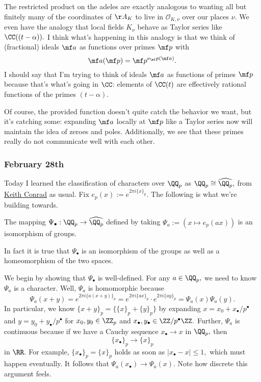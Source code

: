 The restricted product on the adeles are exactly analogous to wanting all but finitely many of the coordinates of $\AA_K$ to live in $\mathcal O_{K,\nu}$ over our places $\nu.$ We even have the analogy that local fields $K_\nu$ behave as Taylor series like $\CC((t-\alpha)).$ I think what's happening in this analogy is that we think of (fractional) ideals $\mf a$ as functions over primes $\mf p$ with
\[\mf a(\mf p)=\mf p^{\nu_\mf p(\mf a)}.\]
I should say that I'm trying to think of ideals $\mf a$ as functions of primes $\mf p$ because that's what's going in $\CC$: elements of $\CC(t)$ are effectively rational functions of the primes $(t-\alpha).$

Of course, the provided function doesn't quite catch the behavior we want, but it's catching some: expanding $\mf a$ locally at $\mf p$ like a Taylor series now will maintain the idea of zeroes and poles. Additionally, we see that these primes really do not communicate well with each other.

\subsubsection{February 28th}
Today I learned the classification of characters over $\QQ_p$ as $\QQ_p\cong\widehat{\QQ_p},$ from \href{https://kconrad.math.uconn.edu/blurbs/gradnumthy/characterQ.pdf}{Keith Conrad} as usual. Fix $e_p(x):=e^{2\pi i\{x\}_p}.$ The following is what we're building towards.
\begin{theorem}
    The mapping $\Psi_\bullet:\QQ_p\to\widehat{\QQ_p}$ defined by taking $\Psi_a:=(x\mapsto e_p(ax))$ is an isomorphism of groups.
\end{theorem}
In fact it is true that $\Psi_\bullet$ is an isomorphism of the groups as well as a homeomorphism of the two spaces.

We begin by showing that $\Psi_\bullet$ is well-defined. For any $a\in\QQ_p,$ we need to know $\Psi_a$ is a character. Well, $\Psi_a$ is homomorphic because
\[\Psi_a(x+y)=e^{2\pi i\{a(x+y)\}_p}=e^{2\pi i\{ax\}_p}\cdot e^{2\pi i\{ay\}_p}=\Psi_a(x)\Psi_a(y).\]
In particular, we know $\{x+y\}_p=\{\{x\}_p+\{y\}_p\}$ by expanding $x=x_0+x_\bullet/p^\bullet$ and $y=y_0+y_\bullet/p^\bullet$ for $x_0,y_0\in\ZZ_p$ and $x_\bullet,y_\bullet\in\ZZ/p^\bullet\ZZ.$ Further, $\Psi_a$ is continuous because if we have a Cauchy sequence $x_\bullet\to x$ in $\QQ_p,$ then
\[\{x_\bullet\}_p\to\{x\}_p\]
in $\RR.$ For example, $\{x_\bullet\}_p=\{x\}_p$ holds as soon as $|x_\bullet-x|\le1,$ which must happen eventually. It follows that $\Psi_a(x_\bullet)\to\Psi_a(x).$ Note how discrete this argument feels.

